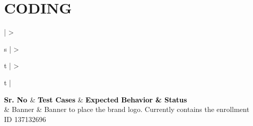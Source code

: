 \documentclass[hidelinks,a4paper,12pt]{article}
\begin{document}
\newpage

\section{\MakeUppercase{Coding}}



\bigskip
\noindent



\begin{center}
	{
	\setlength{\extrarowheight}{2pt}

	\newcolumntype{b}{X}
		
	\renewcommand\thetable{2} 					
	 \label{table:2}
	\vspace{0.25cm}
									
	\begin{tabularx}{\textwidth}{ | >{\ttfamily\raggedright\arraybackslash} s 
	| >{\ttfamily\raggedright\arraybackslash} t 
	| >{\ttfamily\raggedright\arraybackslash} t | }
								
	\hline
								
	{\textbf{\textcolor{black}{{Sr. No} \newline}}} & {\textbf{\textcolor{black}{{Test Cases}}}} & \textbf{\textcolor{black}{{Expected Behavior \& Status}}} \\
								
	 & Banner & Banner to place the brand logo. Currently contains the enrollment ID 137132696  \\
	\hline			
	
	\end{tabularx}
	}
\end{center}
\end{document}
